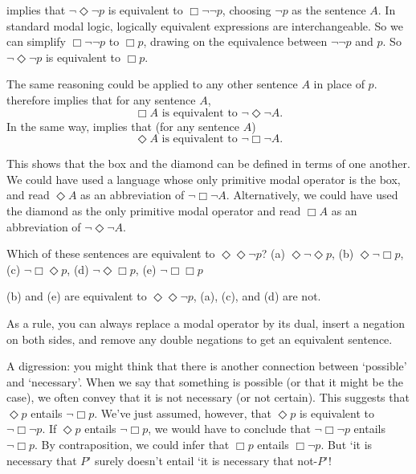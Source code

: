  implies that $\neg\Diamond\neg p$ is equivalent to $\Box\neg\neg p$,
choosing $\neg p$ as the sentence $A$. In standard modal logic, logically
equivalent expressions are interchangeable.\label{claim:replacement} So we can
simplify $\Box \neg\neg p$ to $\Box p$, drawing on the equivalence between
$\neg\neg p$ and $p$. So $\neg\Diamond\neg p$ is equivalent to
$\Box p$.


The same reasoning could be applied to any other sentence $A$ in place of
$p$.  therefore implies that for any sentence $A$,
\[
   \Box A\text{ is equivalent to }\neg\Diamond\neg A.
\]
In the same way,  implies that (for any sentence $A$)
\[
   \Diamond A\text{ is equivalent to }\neg\Box\neg A.
\]


This shows that the box and the diamond can be defined in terms of one another.
We could have used a language whose only primitive modal operator is the box,
and read $\Diamond A$ as an abbreviation of $\neg\Box\neg A$. Alternatively, we
could have used the diamond as the only primitive modal operator and read
$\Box A$ as an abbreviation of $\neg\Diamond\neg A$.

\begin{exercise}
  Which of these sentences are equivalent to $\Diamond\Diamond \neg p$? (a)
  $\Diamond \neg \Diamond p$, (b) $\Diamond\neg \Box p$, (c)
  $\neg\Box\Diamond p$, (d) $\neg\Diamond\Box p$, (e) $\neg\Box\Box p$
\end{exercise}
\begin{solution}
  (b) and (e) are equivalent to $\Diamond\Diamond \neg p$, (a), (c), and (d) are
  not.
  
  As a rule, you can always replace a modal operator by its dual, insert a
  negation on both sides, and remove any double negations to get an equivalent
  sentence.
\end{solution}


A digression: you might think that there is another connection between `possible' and
`necessary'. When we say that something is possible (or that it might be the
case), we often convey that it is not necessary (or not certain). This suggests
that $\Diamond p$ entails $\neg \Box p$. We've just assumed, however, that
$\Diamond p$ is equivalent to $\neg \Box \neg p$. If $\Diamond p$ entails
$\neg \Box p$, we would have to conclude that $\neg\Box\neg p$ entails
$\neg\Box p$. By contraposition, we could infer that $\Box p$ entails
$\Box \neg p$. But `it is necessary that $P$' surely doesn't entail `it is
necessary that not-$P$'!

